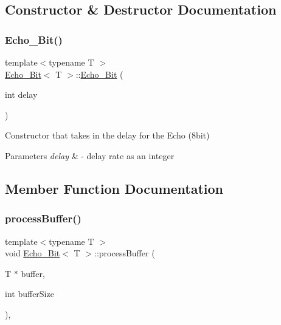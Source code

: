 \subsection{Constructor \& Destructor Documentation}
\mbox{\label{classEcho__8Bit_a19ea3f23dc06bdf6ef74f50e972accf2}} 
\subsubsection{\texorpdfstring{Echo\+\_\+Bit()}{Echo\_8Bit()}}
{\footnotesize\ttfamily template$<$typename T $>$ \\
\hyperlink{classEcho__8Bit}{Echo\+\_\+Bit}$<$ T $>$\+::\hyperlink{classEcho__8Bit}{Echo\+\_\+Bit} (\begin{DoxyParamCaption}\item[{int}]{delay }\end{DoxyParamCaption})\hspace{0.3cm}{\ttfamily [explicit]}}

Constructor that takes in the delay for the Echo (8bit) 
\begin{DoxyParams}{Parameters}
{\em delay} & -\/ delay rate as an integer \\
\hline
\end{DoxyParams}


\subsection{Member Function Documentation}
\mbox{\label{classEcho__8Bit_a01c7182a58f21a4a0bc0cd040720b109}} 
\subsubsection{\texorpdfstring{process\+Buffer()}{processBuffer()}}
{\footnotesize\ttfamily template$<$typename T $>$ \\
void \hyperlink{classEcho__8Bit}{Echo\+\_\+Bit}$<$ T $>$\+::process\+Buffer (\begin{DoxyParamCaption}\item[{T $\ast$}]{buffer,  }\item[{int}]{buffer\+Size }\end{DoxyParamCaption})\hspace{0.3cm}{\ttfamily [override]}, {\ttfamily [virtual]}}

